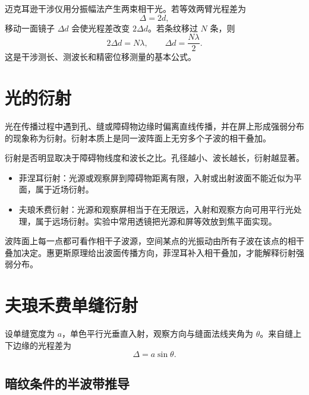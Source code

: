 迈克耳逊干涉仪用分振幅法产生两束相干光。若等效两臂光程差为
\[
  \Delta=2d,
\]
移动一面镜子 $\Delta d$ 会使光程差改变 $2\Delta d$。若条纹移过 $N$ 条，则
\[
  2\Delta d=N\lambda,\qquad \Delta d=\frac{N\lambda}{2}.
\]
这是干涉测长、测波长和精密位移测量的基本公式。

\section{光的衍射}

\begin{definition}[衍射]\label{def:diffraction}
光在传播过程中遇到孔、缝或障碍物边缘时偏离直线传播，并在屏上形成强弱分布的现象称为衍射。衍射本质上是同一波阵面上无穷多个子波的相干叠加。
\end{definition}

衍射是否明显取决于障碍物线度和波长之比。孔径越小、波长越长，衍射越显著。

\begin{definition}[菲涅耳衍射与夫琅禾费衍射]\label{def:fresnel-fraunhofer}
\begin{itemize}
  \item 菲涅耳衍射：光源或观察屏到障碍物距离有限，入射或出射波面不能近似为平面，属于近场衍射。
  \item 夫琅禾费衍射：光源和观察屏相当于在无限远，入射和观察方向可用平行光处理，属于远场衍射。实验中常用透镜把光源和屏等效放到焦平面实现。
\end{itemize}
\end{definition}

\begin{attention}
波阵面上每一点都可看作相干子波源，空间某点的光振动由所有子波在该点的相干叠加决定。惠更斯原理给出波面传播方向，菲涅耳补入相干叠加，才能解释衍射强弱分布。
\end{attention}

\section{夫琅禾费单缝衍射}

设单缝宽度为 $a$，单色平行光垂直入射，观察方向与缝面法线夹角为 $\theta$。来自缝上下边缘的光程差为
\[
  \Delta=a\sin\theta.
\]


\subsection*{暗纹条件的半波带推导}

